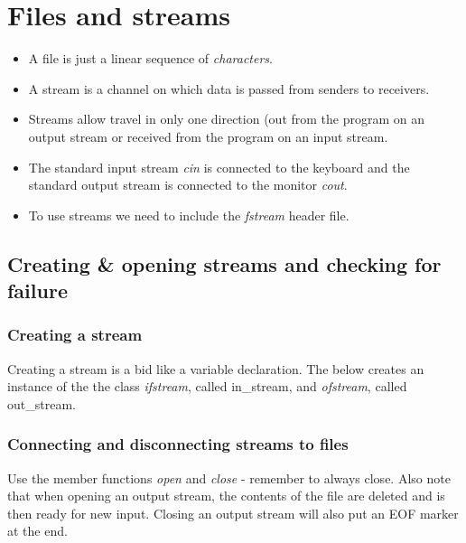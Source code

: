 \section{Files and streams}

\begin{itemize}
	\item A file is just a linear sequence of \emph{characters}.
	\item A stream is a channel on which data is passed from senders to receivers.
	\item Streams allow travel in only one direction (out from the program on an output
	stream or received from the program on an input stream.
	\item The standard input stream \emph{cin} is connected to the keyboard and 
	the standard output stream is connected to the monitor \emph{cout}.
	\item To use streams we need to include the \emph{fstream} header file.
\end{itemize}


\subsection{Creating \& opening streams and checking for failure}
\subsubsection*{Creating a stream}

Creating a stream is a bid like a variable declaration. The below creates an instance of the
the class \emph{ifstream}, called in\_stream, and \emph{ofstream}, called out\_stream.


\subsubsection*{Connecting and disconnecting streams to files}
Use the member functions \emph{open} and \emph{close} - remember to always close. Also note that
when opening an output stream, the contents of the file are deleted and is then ready for new input.
Closing an output stream will also put an EOF marker at the end.

